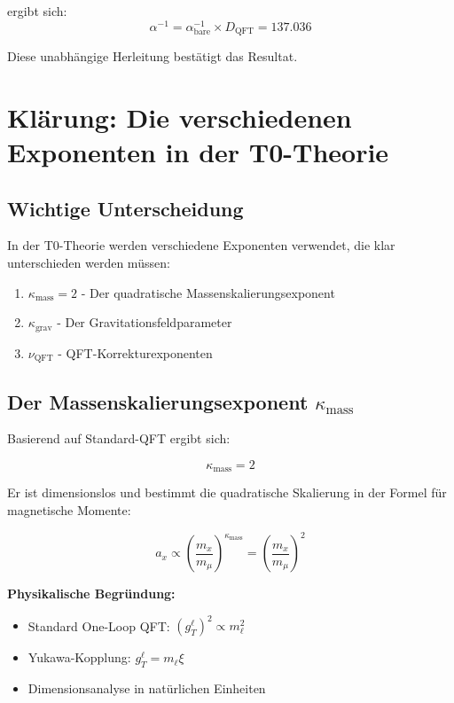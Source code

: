 \documentclass[12pt,a4paper]{article}
\begin{document}
	ergibt sich:
	\begin{equation}
		\alpha^{-1} = \alpha_{\text{bare}}^{-1} \times D_{\text{QFT}} = 137.036
	\end{equation}
	
	Diese unabhängige Herleitung bestätigt das Resultat.
	
	\section{Klärung: Die verschiedenen Exponenten in der T0-Theorie}
	
	\subsection{Wichtige Unterscheidung}
	
	In der T0-Theorie werden verschiedene Exponenten verwendet, die klar unterschieden werden müssen:
	
	\begin{enumerate}
		\item $\kappa_{\text{mass}} = 2$ - Der quadratische Massenskalierungsexponent
		\item $\kappa_{\text{grav}}$ - Der Gravitationsfeldparameter
		\item $\nu_{\text{QFT}}$ - QFT-Korrekturexponenten
	\end{enumerate}
	
	\subsection{Der Massenskalierungsexponent $\kappa_{\text{mass}}$}
	
	Basierend auf Standard-QFT ergibt sich:
	
	\begin{equation}
		\kappa_{\text{mass}} = 2
	\end{equation}
	
	Er ist dimensionslos und bestimmt die quadratische Skalierung in der Formel für magnetische Momente:
	
	\begin{equation}
		a_x \propto \left(\frac{m_x}{m_\mu}\right)^{\kappa_{\text{mass}}} = \left(\frac{m_x}{m_\mu}\right)^{2}
	\end{equation}
	
	\textbf{Physikalische Begründung:}
	\begin{itemize}
		\item Standard One-Loop QFT: $(g_T^\ell)^2 \propto m_\ell^2$
		\item Yukawa-Kopplung: $g_T^\ell = m_\ell \xi$
		\item Dimensionsanalyse in natürlichen Einheiten
	\end{itemize}
	
\end{document}
